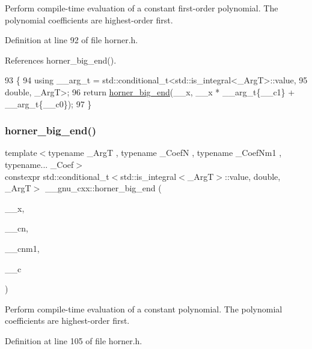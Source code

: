 Perform compile-\/time evaluation of a constant first-\/order polynomial. The polynomial coefficients are highest-\/order first. 

Definition at line 92 of file horner.\+h.



References horner\+\_\+big\+\_\+end().


\begin{DoxyCode}
93   \{
94     \textcolor{keyword}{using} \_\_arg\_t = std::conditional\_t<std::is\_integral<\_ArgT>::value,
95                                         double, \_ArgT>;
96     \textcolor{keywordflow}{return} \hyperlink{namespace____gnu__cxx_afda9e3a1e351db85a89d4e6434576159}{horner\_big\_end}(\_\_x, \_\_x * \_\_arg\_t\{\_\_c1\} + \_\_arg\_t\{\_\_c0\});
97   \}
\end{DoxyCode}
\mbox{\label{namespace____gnu__cxx_afda9e3a1e351db85a89d4e6434576159}} 
\subsubsection{\texorpdfstring{horner\+\_\+big\+\_\+end()}{horner\_big\_end()}\hspace{0.1cm}{\footnotesize\ttfamily [3/3]}}
{\footnotesize\ttfamily template$<$typename \+\_\+\+ArgT , typename \+\_\+\+CoefN , typename \+\_\+\+Coef\+Nm1 , typename... \+\_\+\+Coef$>$ \\
constexpr std\+::conditional\+\_\+t$<$std\+::is\+\_\+integral$<$\+\_\+\+ArgT$>$\+::value, double, \+\_\+\+ArgT$>$ \+\_\+\+\_\+gnu\+\_\+cxx\+::horner\+\_\+big\+\_\+end (\begin{DoxyParamCaption}\item[{\+\_\+\+ArgT}]{\+\_\+\+\_\+x,  }\item[{\+\_\+\+CoefN}]{\+\_\+\+\_\+cn,  }\item[{\+\_\+\+Coef\+Nm1}]{\+\_\+\+\_\+cnm1,  }\item[{\+\_\+\+Coef...}]{\+\_\+\+\_\+c }\end{DoxyParamCaption})}

Perform compile-\/time evaluation of a constant polynomial. The polynomial coefficients are highest-\/order first. 

Definition at line 105 of file horner.\+h.



